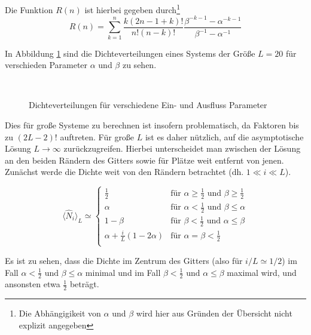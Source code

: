 \documentclass[10pt,a4paper]{report}
\begin{document}
Die Funktion $R(n)$ ist hierbei gegeben durch\footnote{Die Abhängigikeit von $\alpha$ und $\beta$ wird hier aus Gründen der Übersicht nicht explizit angegeben}
\begin{equation}
R(n)=\sum_{k=1}^{n}\frac{k(2n-1+k)!}{n!(n-k)!}\frac{\beta^{-k-1}-\alpha^{-k-1}}{\beta^{-1}-\alpha^{-1}}
\end{equation}

In Abbildung \ref{ASEP_density_img} sind die Dichteverteilungen eines Systems der Größe $L=20$ für verschieden Parameter $\alpha$ und $\beta$ zu sehen.

\begin{figure}
\centering
{}
\\
\caption{Dichteverteilungen für verschiedene Ein- und Ausfluss Parameter}
\label{ASEP_density_img}
\end{figure}

Dies für große Systeme zu berechnen ist insofern problematisch, da Faktoren bis zu $(2L-2)!$ auftreten. Für große $L$ ist es daher nützlich, auf die asymptotische Lösung $L\rightarrow\infty$ zurückzugreifen. Hierbei unterscheidet man zwischen der Lösung an den beiden Rändern des Gitters sowie für Plätze weit entfernt von jenen. Zunächst werde die Dichte weit von den Rändern betrachtet (dh. $1\ll i \ll L$).

\begin{equation}\label{density_equ}
\langle\hat{N}_i\rangle_L\simeq
\begin{cases}
\frac{1}{2}&\text{für }\alpha\geq\frac{1}{2}\text{ und }\beta\geq\frac{1}{2}\\
\alpha&\text{für }\alpha<\frac{1}{2}\text{ und }\beta\leq\alpha\\
1-\beta&\text{für }\beta<\frac{1}{2}\text{ und }\alpha\leq\beta\\
\alpha+\frac{i}{L}(1-2\alpha)&\text{für }\alpha=\beta<\frac{1}{2}\\
\end{cases}
\end{equation}

Es ist zu sehen, dass die Dichte im Zentrum des Gitters (also für $i/L\simeq 1/2$) im Fall $\alpha<\frac{1}{2}\text{ und }\beta\leq\alpha$ minimal und im Fall $\beta<\frac{1}{2}\text{ und }\alpha\leq\beta$ maximal wird, und ansonsten etwa $\frac{1}{2}$ beträgt.
\end{document}
